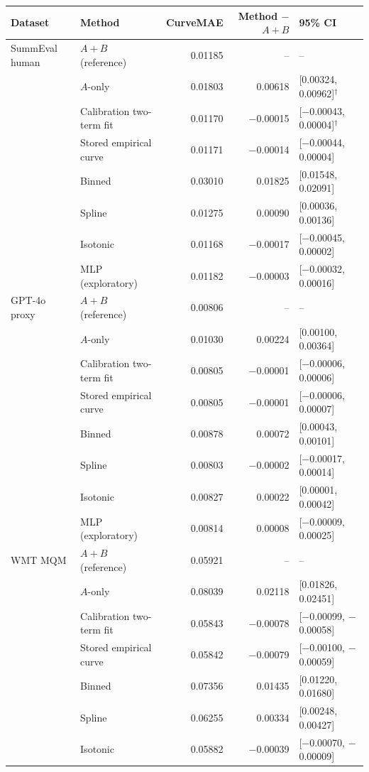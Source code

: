 \begin{tabular}{llrrl}
\toprule
Dataset & Method & CurveMAE & Method $-$ $A{+}B$ & 95\% CI \\
\midrule
SummEval human & $A{+}B$ (reference) & 0.01185 & -- & -- \\
 & $A$-only & 0.01803 & 0.00618 & [0.00324, 0.00962]$^{\dagger}$ \\
 & Calibration two-term fit & 0.01170 & $-$0.00015 & [$-$0.00043, 0.00004]$^{\dagger}$ \\
 & Stored empirical curve & 0.01171 & $-$0.00014 & [$-$0.00044, 0.00004] \\
 & Binned & 0.03010 & 0.01825 & [0.01548, 0.02091] \\
 & Spline & 0.01275 & 0.00090 & [0.00036, 0.00136] \\
 & Isotonic & 0.01168 & $-$0.00017 & [$-$0.00045, 0.00002] \\
 & MLP (exploratory) & 0.01182 & $-$0.00003 & [$-$0.00032, 0.00016] \\
\midrule
GPT-4o proxy & $A{+}B$ (reference) & 0.00806 & -- & -- \\
 & $A$-only & 0.01030 & 0.00224 & [0.00100, 0.00364] \\
 & Calibration two-term fit & 0.00805 & $-$0.00001 & [$-$0.00006, 0.00006] \\
 & Stored empirical curve & 0.00805 & $-$0.00001 & [$-$0.00006, 0.00007] \\
 & Binned & 0.00878 & 0.00072 & [0.00043, 0.00101] \\
 & Spline & 0.00803 & $-$0.00002 & [$-$0.00017, 0.00014] \\
 & Isotonic & 0.00827 & 0.00022 & [0.00001, 0.00042] \\
 & MLP (exploratory) & 0.00814 & 0.00008 & [$-$0.00009, 0.00025] \\
\midrule
WMT MQM & $A{+}B$ (reference) & 0.05921 & -- & -- \\
 & $A$-only & 0.08039 & 0.02118 & [0.01826, 0.02451] \\
 & Calibration two-term fit & 0.05843 & $-$0.00078 & [$-$0.00099, $-$0.00058] \\
 & Stored empirical curve & 0.05842 & $-$0.00079 & [$-$0.00100, $-$0.00059] \\
 & Binned & 0.07356 & 0.01435 & [0.01220, 0.01680] \\
 & Spline & 0.06255 & 0.00334 & [0.00248, 0.00427] \\
 & Isotonic & 0.05882 & $-$0.00039 & [$-$0.00070, $-$0.00009] \\

\end{tabular}
